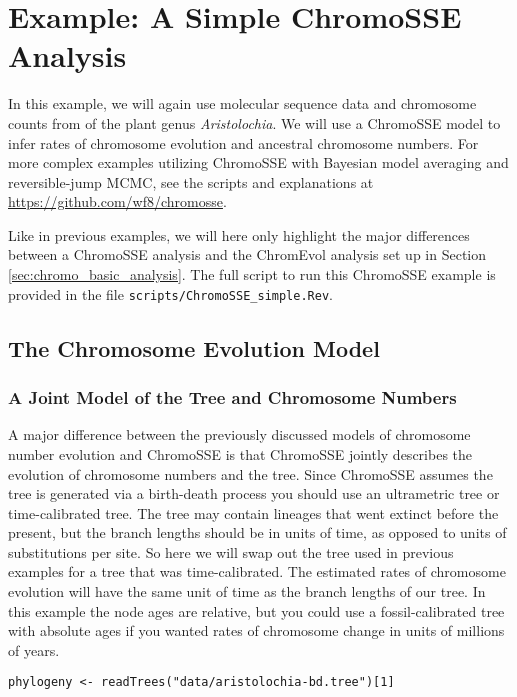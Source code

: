 
\section{Example: A Simple ChromoSSE Analysis}\label{sec:chromosse_analysis}

In this example, we will again use molecular sequence data and chromosome counts from \citet{ohi2006molecular} of the plant genus \textit{Aristolochia}. 
We will use a ChromoSSE model to infer rates of chromosome evolution and ancestral chromosome numbers.
For more complex examples utilizing ChromoSSE with Bayesian model averaging and reversible-jump
MCMC, see the scripts and explanations at \url{https://github.com/wf8/chromosse}.

Like in previous examples, we will here only highlight the major differences between a ChromoSSE
analysis and the ChromEvol analysis set up in Section \ref{sec:chromo_basic_analysis}.
The full script to run this ChromoSSE example is provided in the file \texttt{scripts/ChromoSSE\_simple.Rev}.


\bigskip
\subsection{The Chromosome Evolution Model}

\subsubsection{A Joint Model of the Tree and Chromosome Numbers}

A major difference between the previously discussed models of chromosome number evolution
and ChromoSSE is that ChromoSSE jointly describes the evolution of chromosome numbers
and the tree. Since ChromoSSE assumes the tree is generated via a birth-death process
you should use an ultrametric tree or time-calibrated tree.
The tree may contain lineages that went extinct before the present,
but the branch lengths should be in units of time, as opposed to 
units of substitutions per site.
So here we will swap out the tree used in previous examples for a tree
that was time-calibrated. 
The estimated rates of chromosome evolution will
have the same unit of time as the branch lengths of our tree.
In this example the node ages are relative, but you could
use a fossil-calibrated tree with absolute ages if you wanted
rates of chromosome change in units of millions of years.
{\tt \begin{snugshade*}
\begin{lstlisting}
phylogeny <- readTrees("data/aristolochia-bd.tree")[1]
\end{lstlisting}
\end{snugshade*}
}


